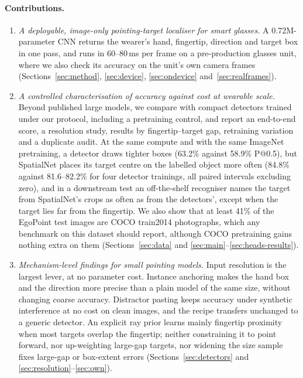 \paragraph{Contributions.}
\begin{enumerate}
\item \emph{A deployable, image-only pointing-target localiser for smart glasses.} A 0.72M-parameter CNN returns the wearer's hand, fingertip, direction and target box in one pass, and runs in 60--80\,ms per frame on a pre-production glasses unit, where we also check its accuracy on the unit's own camera frames (Sections~\ref{sec:method}, \ref{sec:device}, \ref{sec:ondevice} and~\ref{sec:realframes}).
\item \emph{A controlled characterisation of accuracy against cost at wearable scale.} Beyond published large models, we compare with compact detectors trained under our protocol, including a pretraining control, and report an end-to-end score, a resolution study, results by fingertip--target gap, retraining variation and a duplicate audit. At the same compute and with the same ImageNet pretraining, a detector draws tighter boxes (63.2\% against 58.9\% P@0.5), but SpatialNet places its target centre on the labelled object more often (84.8\% against 81.6--82.2\% for four detector trainings, all paired intervals excluding zero), and in a downstream test an off-the-shelf recogniser names the target from SpatialNet's crops as often as from the detectors', except when the target lies far from the fingertip. We also show that at least 41\% of the EgoPoint test images are COCO train2014 photographs, which any benchmark on this dataset should report, although COCO pretraining gains nothing extra on them (Sections~\ref{sec:data} and \ref{sec:main}--\ref{sec:heads-results}).
\item \emph{Mechanism-level findings for small pointing models.} Input resolution is the largest lever, at no parameter cost. Instance anchoring makes the hand box and the direction more precise than a plain model of the same size, without changing coarse accuracy. Distractor pasting keeps accuracy under synthetic interference at no cost on clean images, and the recipe transfers unchanged to a generic detector. An explicit ray prior learns mainly fingertip proximity when most targets overlap the fingertip; neither constraining it to point forward, nor up-weighting large-gap targets, nor widening the size sample fixes large-gap or box-extent errors (Sections~\ref{sec:detectors} and \ref{sec:resolution}--\ref{sec:own}).
\end{enumerate}
